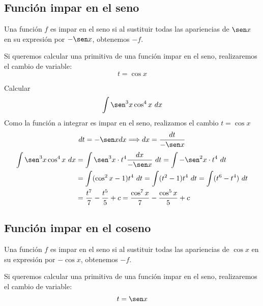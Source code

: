 \subsection{Función impar en el seno}
\begin{definicion}
    Una función $f$ es impar en el seno si al sustituir todas las apariencias de $\sen x$ en su expresión por $-\sen x$, obtenemos $-f$.
\end{definicion}
Si queremos calcular una primitiva de una función impar en el seno, realizaremos el cambio de variable:
\begin{equation*}
    t = \cos x
\end{equation*}

\begin{ejemplo}
    Calcular
    \begin{equation*}
        \displaystyle\int \sen^3 x \cos^4 x~dx 
    \end{equation*}
    Como la función a integrar es impar en el seno, realizamos el cambio $t = \cos x$
    \begin{equation*}
        dt = -\sen x dx \Longrightarrow dx = \dfrac{dt}{-\sen x}
    \end{equation*}
    \begin{align*}
        \displaystyle\int \sen^3x\cos^4x~dx  &= \displaystyle\int \sen^3x\cdot t^4 \dfrac{dx}{-\sen x}~dt = \displaystyle\int -\sen^2 x \cdot t^4~dt  \\
                                             &= \displaystyle\int (\cos^2 x - 1)t^4~dt = \displaystyle\int (t^2-1)t^4~dt = \displaystyle\int (t^6 - t^4)~dt \\
                                             &= \dfrac{t^7}{7}-\dfrac{t^5}{5} + c =  \dfrac{\cos^7 x}{7}-\dfrac{\cos^5x}{5} + c
    \end{align*}
\end{ejemplo}

\subsection{Función impar en el coseno}
\begin{definicion}
    Una función $f$ es impar en el seno si al sustituir todas las apariencias de $\cos x$ en su expresión por $-\cos x$, obtenemos $-f$.
\end{definicion}
Si queremos calcular una primitiva de una función impar en el seno, realizaremos el cambio de variable:
\begin{equation*}
    t = \sen x
\end{equation*}

